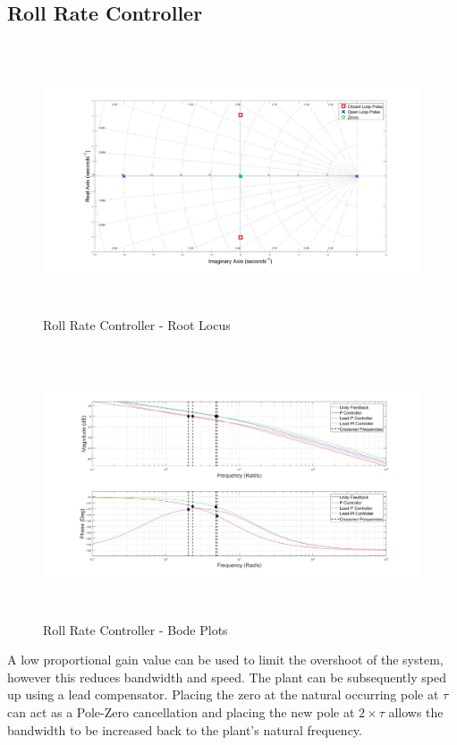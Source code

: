 	 \subsection{Roll Rate Controller}
	 
	 \begin{figure}[H]
	 	\centering
	 	\includegraphics[height = 8cm]{../Design/Matlab/Controllers/roll_rate_root.jpg}
	 	\caption{Roll Rate Controller -  Root Locus}
	 	\label{IM_RollRateControlRoot}
	 \end{figure}
	 
	 \begin{figure}[H]
	 	\centering
	 	\includegraphics[height = 8cm]{../Design/Matlab/Controllers/roll_rate_bode.jpg}
	 	\caption{Roll Rate Controller -  Bode Plots}
	 	\label{IM_RollRateControlBode}
	 \end{figure}
	 
	 A low proportional gain value can be used to limit the overshoot of the system, however this reduces bandwidth and speed. The plant can be subsequently sped up using a lead compensator. Placing the zero at the natural occurring pole at $\tau$ can act as a Pole-Zero cancellation and placing the new pole at $2 \times \tau$ allows the bandwidth to be increased back to the plant's natural frequency. 
	 
